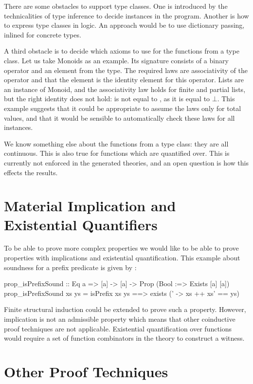 There are some obstacles to support type classes. One is introduced by
the technicalities of type inference to decide instances in the
program. Another is how to express type classes in logic. An approach
would be to use dictionary passing, inlined for concrete types.

A third obstacle is to decide which axioms to use for the functions
from a type class. Let us take Monoids as an example. Its signature
consists of a binary operator and an element from the type. The
required laws are associativity of the operator and that the element
is the identity element for this operator. Lists are an instance of
Monoid, and the associativity law holds for finite and partial lists,
but the right identity does not hold: \hs{$\bot$ ++ []} is not equal
to \hs{[]}, as it is equal to $\bot$. This example suggests that it
could be appropriate to assume the laws only for total values, and
that it would be sensible to automatically check these laws for all
instances.

We know something else about the functions from a type class: they are
all continuous. This is also true for functions which are quantified
over. This is currently not enforced in the generated theories, and an
open question is how this effects the results.

\section{Material Implication and Existential Quantifiers}

To be able to prove more complex properties we would like to be able
to prove properties with implications and existential quantification.
This example about soundness for a prefix predicate is given by
\cite{smallcheck}:

\begin{code}
prop_isPrefixSound :: Eq a => [a] -> [a] -> Prop (Bool :=> Exists [a] [a])
prop_isPrefixSound xs ys = isPrefix xs ys ==> exists (\xs' -> xs ++ xs' == ys)
\end{code}

Finite structural induction could be extended to prove such a
property. However, implication is not an admissible property which
means that other coinductive proof techniques are not
applicable. Existential quantification over functions would require a
set of function combinators in the theory to construct a witness.

\section{Other Proof Techniques}

